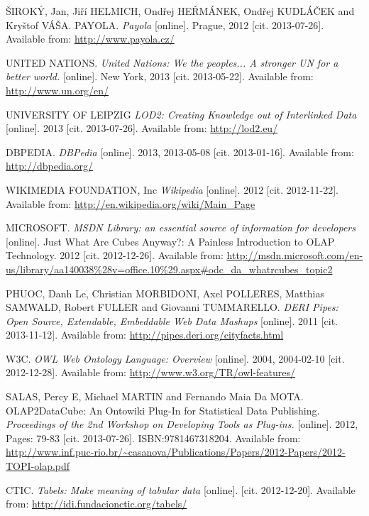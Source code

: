 \begin{thebibliography}{99}
{\sc ŠIROKÝ}, Jan, Jiří HELMICH, Ondřej HEŘMÁNEK, Ondřej KUDLÁČEK and Kryštof VÁŠA.
PAYOLA. \emph{Payola} [online]. Prague, 2012 [cit. 2013-07-26]. 
Available from: \url{http://www.payola.cz/}

{\sc UNITED NATIONS.}
\emph{United Nations: We the peoples... A stronger UN for a better world.} [online].
New York, 2013 [cit. 2013-05-22]. 
Available from: \url{http://www.un.org/en/}

{\sc UNIVERSITY OF LEIPZIG}
\emph{LOD2: Creating Knowledge out of Interlinked Data} [online]. 2013
[cit. 2013-07-26].
Available from: \url{http://lod2.eu/}

{\sc DBPEDIA.} 
\emph{DBPedia} [online]. 2013, 2013-05-08 [cit. 2013-01-16]. 
Available from: \url{http://dbpedia.org/}

{\sc WIKIMEDIA FOUNDATION, Inc}
\emph{Wikipedia} [online]. 2012 [cit. 2012-11-22].
Available from:  \url{http://en.wikipedia.org/wiki/Main_Page}

{\sc MICROSOFT.}
\emph{MSDN Library: an essential source of information for developers} [online].
Just What Are Cubes Anyway?: A Painless Introduction to OLAP Technology.
2012 [cit. 2012-12-26].
Available from: \url{http://msdn.microsoft.com/en-us/library/aa140038%28v=office.10%29.aspx#odc\_da\_whatrcubes\_topic2}

{\sc PHUOC,} Danh Le, Christian MORBIDONI, Axel POLLERES,
Matthias SAMWALD, Robert FULLER and Giovanni TUMMARELLO.
\emph{DERI Pipes: Open Source, Extendable, Embeddable Web Data Mashups} [online]. 2011
[cit. 2013-11-12].
Available from: \url{http://pipes.deri.org/cityfacts.html}

{\sc W3C.}
\emph{OWL Web Ontology Language: Overview} [online]. 2004,
2004-02-10 [cit. 2012-12-28].
Available from: \url{http://www.w3.org/TR/owl-features/}

{\sc SALAS,} Percy E, Michael MARTIN and Fernando Maia Da MOTA.
OLAP2DataCube: An Ontowiki Plug-In for Statistical Data Publishing.
\emph{Proceedings of the 2nd Workshop on Developing Tools as Plug-ins.} 
[online]. 2012, Pages: 79-83 [cit. 2013-07-26]. ISBN:9781467318204.
Available from: \url{http://www.inf.puc-rio.br/~casanova/Publications/Papers/2012-Papers/2012-TOPI-olap.pdf}

{\sc CTIC.}
\emph{Tabels: Make meaning of tabular data} [online]. [cit. 2012-12-20].
Available from: \url{http://idi.fundacionctic.org/tabels/}


\end{thebibliography}
